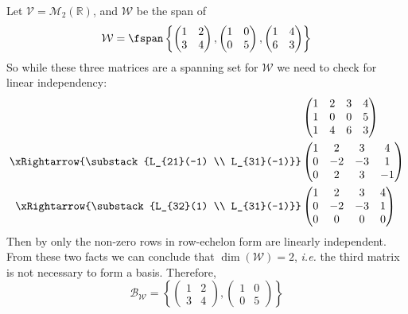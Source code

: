 \begin{exm}
	Let $\mathcal{V}=\mathcal{M}_2(\mathbb{R})$, and $\mathcal{W}$ be the span of
	\begin{equation*}
		\mathcal{W}=\fspan\left\{\begin{pmatrix}
			1 & 2 \\
			3 & 4
		\end{pmatrix},
		\begin{pmatrix}
			1 & 0 \\
			0 & 5
		\end{pmatrix},
		\begin{pmatrix}
			1 & 4 \\
			6 & 3
		\end{pmatrix}\right\}
	\end{equation*}
	So while these three matrices are a spanning set for $\mathcal{W}$ we need
	to check for linear independency:
	\begin{align*}
		 & \begin{pmatrix}
			1 & 2 & 3 & 4 \\
			1 & 0 & 0 & 5 \\
			1 & 4 & 6 & 3
		\end{pmatrix}     \\
		\xRightarrow{\substack{L_{21}(-1) \\ L_{31}(-1)}}
		 & \begin{pmatrix}
			1 & 2  & 3  & 4  \\
			0 & -2 & -3 & 1  \\
			0 & 2  & 3  & -1
		\end{pmatrix}     \\
		\xRightarrow{\substack{L_{32}(1)  \\ L_{31}(-1)}}
		 & \begin{pmatrix}
			1 & 2  & 3  & 4 \\
			0 & -2 & -3 & 1 \\
			0 & 0  & 0  & 0
		\end{pmatrix}
	\end{align*}
	Then by 
	only the non-zero rows in row-echelon form are linearly independent. From
	these two facts we can conclude that $\dim(\mathcal{W})=2$, \textit{i.e.}
	the third matrix is not necessary to form a basis. Therefore,
	\begin{equation*}
		\mathcal{B}_\mathcal{W}=\left\{
		\begin{pmatrix}
			1 & 2 \\
			3 & 4
		\end{pmatrix},
		\begin{pmatrix}
			1 & 0 \\
			0 & 5
		\end{pmatrix}
		\right\}
	\end{equation*}
\end{exm}

